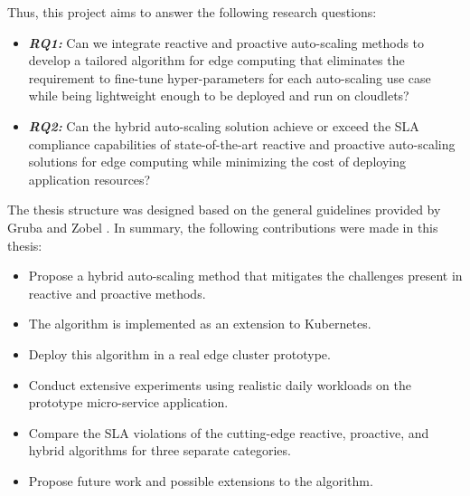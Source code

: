 Thus, this project aims to answer the following research questions:

\begin{itemize}
    \item \textbf{\textit{RQ1:}} Can we integrate reactive and proactive auto-scaling methods to develop a tailored algorithm for edge computing that eliminates the requirement to fine-tune hyper-parameters for each auto-scaling use case while being lightweight enough to be deployed and run on cloudlets?
    \item \textbf{\textit{RQ2:}} Can the hybrid auto-scaling solution achieve or exceed the SLA compliance capabilities of state-of-the-art reactive and proactive auto-scaling solutions for edge computing while minimizing the cost of deploying application resources?
\end{itemize}

The thesis structure was designed based on the general guidelines provided by Gruba and Zobel \cite{gruba2017write}. In summary, the following contributions were made in this thesis:

\begin{itemize}
    \item Propose a hybrid auto-scaling method that mitigates the challenges present in reactive and proactive methods.
    \item The algorithm is implemented as an extension to Kubernetes.
    \item Deploy this algorithm in a real edge cluster prototype.
    \item Conduct extensive experiments using realistic daily workloads on the prototype micro-service application.
    \item Compare the SLA violations of the cutting-edge reactive, proactive, and hybrid algorithms for three separate categories.
    \item Propose future work and possible extensions to the algorithm.
\end{itemize}
